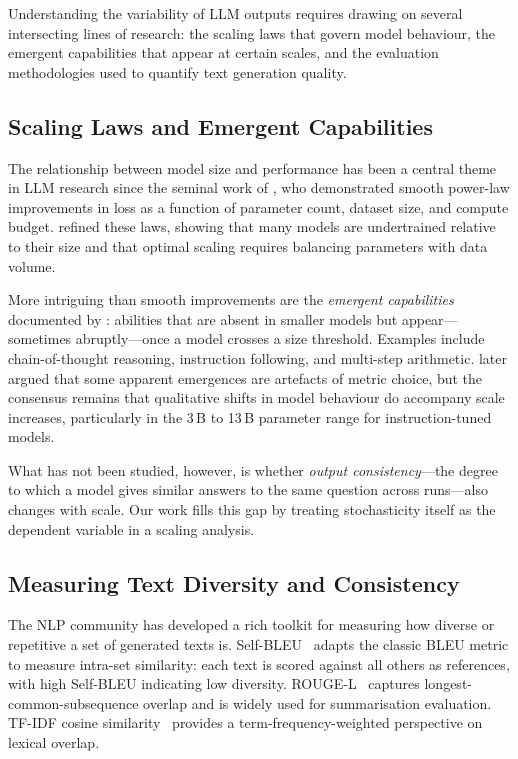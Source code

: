 \documentclass[11pt,a4paper]{article}
\begin{document}
Understanding the variability of LLM outputs requires drawing on several intersecting lines of research: the scaling laws that govern model behaviour, the emergent capabilities that appear at certain scales, and the evaluation methodologies used to quantify text generation quality.

\subsection{Scaling Laws and Emergent Capabilities}

The relationship between model size and performance has been a central theme in LLM research since the seminal work of \citet{kaplan2020scaling}, who demonstrated smooth power-law improvements in loss as a function of parameter count, dataset size, and compute budget.
\citet{hoffmann2022training} refined these laws, showing that many models are undertrained relative to their size and that optimal scaling requires balancing parameters with data volume.

More intriguing than smooth improvements are the \emph{emergent capabilities} documented by \citet{wei2022emergent}: abilities that are absent in smaller models but appear---sometimes abruptly---once a model crosses a size threshold.
Examples include chain-of-thought reasoning, instruction following, and multi-step arithmetic.
\citet{schaeffer2023emergent} later argued that some apparent emergences are artefacts of metric choice, but the consensus remains that qualitative shifts in model behaviour do accompany scale increases, particularly in the 3\,B to 13\,B parameter range for instruction-tuned models.

What has not been studied, however, is whether \emph{output consistency}---the degree to which a model gives similar answers to the same question across runs---also changes with scale.
Our work fills this gap by treating stochasticity itself as the dependent variable in a scaling analysis.

\subsection{Measuring Text Diversity and Consistency}

The NLP community has developed a rich toolkit for measuring how diverse or repetitive a set of generated texts is.
Self-BLEU~\citep{zhu2018texygen} adapts the classic BLEU metric to measure intra-set similarity: each text is scored against all others as references, with high Self-BLEU indicating low diversity.
ROUGE-L~\citep{lin2004rouge} captures longest-common-subsequence overlap and is widely used for summarisation evaluation.
TF-IDF cosine similarity~\citep{salton1988term} provides a term-frequency-weighted perspective on lexical overlap.
\end{document}
